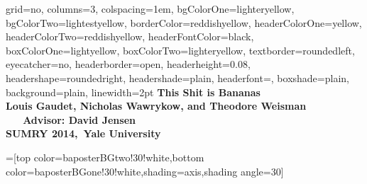 \documentclass[landscape,final,columns=3]{baposter}
\begin{document}
\begin{poster}{
  grid=no,
  columns=3,
   colspacing=1em,
  bgColorOne=lighteryellow, %
  bgColorTwo=lightestyellow, %
  borderColor=reddishyellow,
  headerColorOne=yellow,
  headerColorTwo=reddishyellow,
  headerFontColor=black,
  boxColorOne=lightyellow,
  boxColorTwo=lighteryellow,
  textborder=roundedleft,
  eyecatcher=no,
  headerborder=open,
  headerheight=0.08\textheight,
  headershape=roundedright,
  headershade=plain,
  headerfont=\Large\textsf, %
  boxshade=plain,
  background=plain,
  linewidth=2pt
  }
  {
  }
{\bf{\textcolor{mit}{This Shit is Bananas}} %
{\rm \\ \large  Louis Gaudet, Nicholas Wawrykow, and Theodore Weisman \ \ \
 \textbf{Advisor:} David Jensen\\
 SUMRY 2014,\ Yale University
  }}


  =[top color=baposterBGtwo!30!white,bottom color=baposterBGone!30!white,shading=axis,shading angle=30]
     \newlength{\leftimgwidth}
     \setlength{\leftimgwidth}{0.78em+8.0em}


\end{poster}
\end{document}
